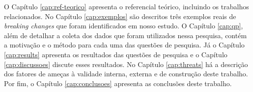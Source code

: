 O Capítulo \ref{cap:ref-teorico} apresenta o referencial teórico, incluindo os trabalhos relacionados. No Capítulo \ref{cap:exemplos} são descritos três exemplos reais de \textit{breaking changes} que foram identificados em nosso estudo. O Capítulo \ref{cap:qp}, além de detalhar a coleta dos dados que foram utilizados nessa pesquisa, contém a motivação e o método para cada uma das questões de pesquisa. Já o Capítulo \ref{cap:results} apresenta os resultados das questões de pesquisa e o Capítulo \ref{cap:discussoes} discute esses resultados. No Capítulo \ref{cap:threats} há a descrição dos fatores de ameças à validade interna, externa e de construção deste trabalho. Por fim, o Capítulo \ref{cap:conclusoes} apresenta as conclusões deste trabalho.